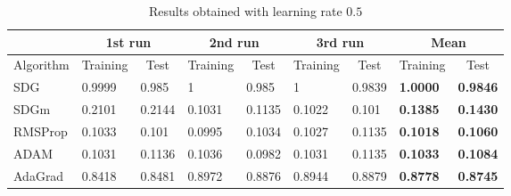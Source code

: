 \documentclass[12pt]{article}
\begin{document}
\begin{table}
\centering
\begin{tabular}{l|l|l|l|l|l|l|l|l|}
\cline{2-9}
 & \multicolumn{2}{c|}{1st run} & \multicolumn{2}{c|}{2nd run} & \multicolumn{2}{c|}{3rd run} & \multicolumn{2}{c|}{Mean} \\ \hline
\multicolumn{1}{|l|}{Algorithm} & \multicolumn{1}{c|}{Training} & \multicolumn{1}{c|}{Test} & \multicolumn{1}{c|}{Training} & \multicolumn{1}{c|}{Test} & \multicolumn{1}{c|}{Training} & \multicolumn{1}{c|}{Test} & \multicolumn{1}{c|}{Training} & \multicolumn{1}{c|}{Test} \\ \hline
\multicolumn{1}{|l|}{SDG} & 0.9999 & 0.985 & 1 & 0.985 & 1 & 0.9839 & \textbf{1.0000} & \textbf{0.9846} \\ \cline{1-1}
\multicolumn{1}{|l|}{SDGm} & 0.2101 & 0.2144 & 0.1031 & 0.1135 & 0.1022 & 0.101 & \textbf{0.1385} & \textbf{0.1430} \\ \cline{1-1}
\multicolumn{1}{|l|}{RMSProp} & 0.1033 & 0.101 & 0.0995 & 0.1034 & 0.1027 & 0.1135 & \textbf{0.1018} & \textbf{0.1060} \\ \cline{1-1}
\multicolumn{1}{|l|}{ADAM} & 0.1031 & 0.1136 & 0.1036 & 0.0982 & 0.1031 & 0.1135 & \textbf{0.1033} & \textbf{0.1084} \\ \cline{1-1}
\multicolumn{1}{|l|}{AdaGrad} & 0.8418 & 0.8481 & 0.8972 & 0.8876 & 0.8944 & 0.8879 & \textbf{0.8778} & \textbf{0.8745} \\ \hline
\end{tabular}
\caption{Results obtained with learning rate $0.5$}
\label{tab:0-5}
\end{table}
\end{document}
